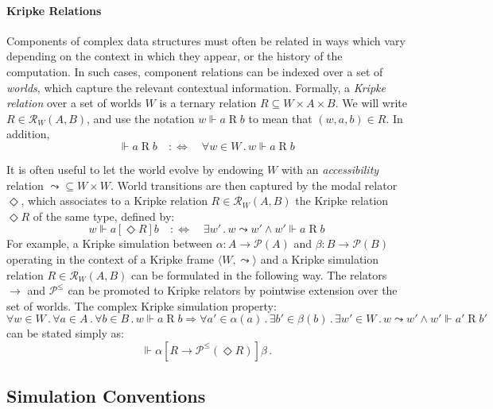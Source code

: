 \documentclass[acmsmall,screen,review,anonymous]{acmart}
\newcommand{\ifr}[1]{\mathrel{[{#1}]}}
\begin{document}
\paragraph{Kripke Relations}

Components of complex data structures
must often be related in ways which vary
depending on the context in which they appear,
or the history of the computation.
In such cases,
component relations can be indexed over a set of \emph{worlds},
which capture the relevant contextual information.
Formally, a \emph{Kripke relation} over a set of worlds $W$
is a ternary relation $R \subseteq W \times A \times B$.
We will write $R \in \mathcal{R}_W(A, B)$,
and use the notation
$
  w \Vdash a \mathrel{R} b
$
to mean that $(w, a, b) \in R$.
In addition,
\[
  {} \Vdash a \mathrel{R} b
  \quad :\Leftrightarrow \quad
  \forall w\in W \mathbin. w \Vdash a \mathrel{R} b
\]

It is often useful to let the world evolve
by endowing $W$ with an \emph{accessibility} relation
${\leadsto} \subseteq W \times W$.
World transitions are then captured by the modal relator $\Diamond$,
which associates to a Kripke relation $R \in \mathcal{R}_W(A, B)$
the Kripke relation $\Diamond R$ of the same type, defined by:
\[
  w \Vdash a \ifr{\Diamond R} b
  \quad:\Leftrightarrow\quad
  \exists w' \mathbin. w \leadsto w' \wedge w' \Vdash a \mathrel{R} b
\]
For example,
a Kripke simulation between $\alpha : A \rightarrow \mathcal{P}(A)$
and $\beta : B \rightarrow \mathcal{P}(B)$
operating in the context of a Kripke frame $\langle W, {\leadsto} \rangle$
and a Kripke simulation relation $R \in \mathcal{R}_W(A, B)$
can be formulated in the following way.
The relators $\rightarrow$ and $\mathcal{P}^\le$
can be promoted to Kripke relators
by pointwise extension over the set of worlds.
The complex Kripke simulation property:
{\small
\[
  \forall w \in W \mathbin.
  \forall a \in A \mathbin.
  \forall b \in B \mathbin.
  w \Vdash a \mathrel{R} b \Rightarrow
  \forall a' \in \alpha(a) \mathbin.
  \exists b' \in \beta(b) \mathbin.
  \exists w' \in W \mathbin.
  w \leadsto w' \wedge w' \Vdash a' \mathrel{R} b'
\]
}
can be stated simply as:
\[
  \Vdash \alpha \ifr{R \rightarrow \mathcal{P}^\le(\Diamond R)} \beta
  \,.
\]


\subsection{Simulation Conventions} %
\end{document}
